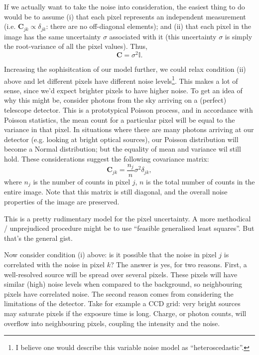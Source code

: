 \documentclass[letterpaper, 11pt]{article}
\begin{document}
If we actually want to take the noise into consideration, the easiest thing to do would be to assume (i) that each pixel represents an independent measurement (i.e. $\mathbf{C}_{jk}\propto \delta_{jk}$: there are no off-diagonal elements); and (ii) that each pixel in the image has the same uncertainty $\sigma$ associated with it (this uncertainty $\sigma$ is simply the root-variance of all the pixel values). Thus,
\begin{equation}
	\mathbf C = \sigma^2\mathbb{I}.
\end{equation}

Increasing the sophisitcation of our model further, we could relax condition (ii) above and let different pixels have different noise levels\footnote{I believe one would describe this variable noise model as ``heteroscedastic''.}. This makes a lot of sense, since we'd expect brighter pixels to have higher noise. To get an idea of why this might be, consider photons from the sky arriving on a (perfect) telescope detector. This is a prototypical Poisson process, and in accordance with Poisson statistics, the mean count for a particular pixel will be equal to the variance in that pixel. In situations where there are many photons arriving at our detector (e.g. looking at bright optical sources), our Poisson distribution will become a Normal distribution; but the equality of mean and variance wil still hold. These considerations suggest the following covariance matrix:
\begin{equation}\label{eqn:covmat}
	\mathbf{C}_{jk} = \frac{n_j}{n}\sigma^2\delta_{jk},
\end{equation}
where $n_j$ is the number of counts in pixel $j$, $n$ is the total number of counts in the entire image. Note that this matrix is still diagonal, and the overall noise properties of the image are preserved.

This is a pretty rudimentary model for the pixel uncertainty. A more methodical / unprejudiced procedure might be to use ``feasible generalised least squares''. But that's the general gist.

Now consider condition (i) above: is it possible that the noise in pixel $j$ is correlated with the noise in pixel $k$? The answer is yes, for two reasons. First, a well-resolved source will be spread over several pixels. These pixels will have similar (high) noise levels when compared to the background, so neighbouring pixels have correlated noise. The second reason comes from considering the limitations of the detector. Take for example a CCD grid: very bright sources may saturate pixels if the exposure time is long. Charge, or photon counts, will overflow into neighbouring pixels, coupling the intensity and the noise.
\end{document}
